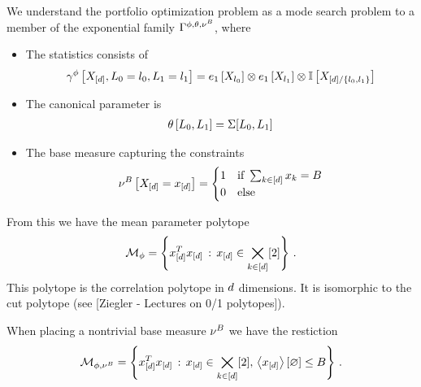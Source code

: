 \documentclass[aps,onecolumn,nofootinbib,pra]{article}
\begin{document}
    We understand the portfolio optimization problem as a mode search problem to a member of the exponential family $\Gamma^{\phi,\theta,\nu^{B}}$, where
    \begin{itemize}
        \item The statistics consists of
        \begin{align*}
            \gamma^{\phi}\left[X_{[d]},L_{0}=l_{0},L_{1}=l_{1}\right]
            = e_1\left[X_{l_{0}}\right] \otimes e_1\left[X_{l_{1}}\right] \otimes \mathbb{I}\left[X_{[d]/\{l_{0},l_{1}\}}\right]
        \end{align*}
        \item The canonical parameter is
        \begin{align*}
            \theta\left[L_{0},L_{1}\right]
            = \Sigma[L_{0},L_{1}]
        \end{align*}
        \item The base measure capturing the constraints
        \begin{align*}
        \nu^{B}\left[X_{[d]}=x_{[d]}\right]
        =\begin{cases}
             1 & \text{if } \sum_{k\in[d]}x_{k} = B \\
             0 & \text{else}
        \end{cases}
    \end{align*}
    \end{itemize}

    From this we have the mean parameter polytope
    \begin{align*}
        \mathcal{M}_{\phi} = \left\{ x_{[d]}^Tx_{[d]} \, : \, x_{[d]}\in\bigtimes_{k\in[d]}[2]\right\} \, .
    \end{align*}
    This polytope is the correlation polytope in $d$ dimensions.
    It is isomorphic to the cut polytope (see [Ziegler - Lectures on 0/1 polytopes]).

    When placing a nontrivial base measure $\nu^{B}$ we have the restiction
    \begin{align*}
        \mathcal{M}_{\phi,\nu^{B}} = \left\{ x_{[d]}^Tx_{[d]} \, : \, x_{[d]}\in\bigtimes_{k\in[d]}[2], \, \left\langle x_{[d]}\right\rangle \left[ \varnothing \right] \leq B\right\} \, .
    \end{align*}
\end{document}
